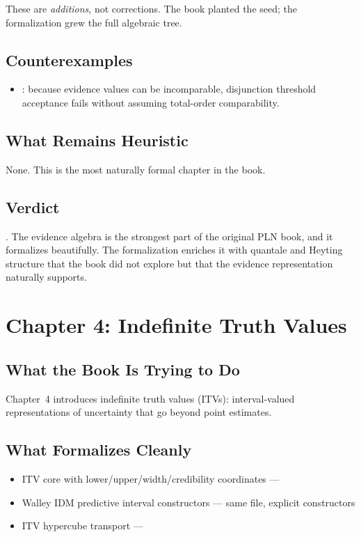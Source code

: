 \documentclass[11pt,openany]{report}
\begin{document}
These are \emph{additions}, not corrections.  The book planted the seed;
the formalization grew the full algebraic tree.

\section{Counterexamples}

\begin{itemize}
\item {}: because evidence values can be
  incomparable, disjunction threshold acceptance fails without assuming
  total-order comparability.
\end{itemize}

\section{What Remains Heuristic}

None.  This is the most naturally formal chapter in the book.

\section{Verdict}

\verdictClean{}.  The evidence algebra is the strongest part of the
original PLN book, and it formalizes beautifully.  The formalization
enriches it with quantale and Heyting structure that the book did not
explore but that the evidence representation naturally supports.


\chapter{Chapter 4: Indefinite Truth Values}
\label{ch:review-ch4}

\section{What the Book Is Trying to Do}

Chapter~4 introduces indefinite truth values (ITVs): interval-valued
representations of uncertainty that go beyond point estimates.

\section{What Formalizes Cleanly}

\begin{itemize}
\item ITV core with lower/upper/width/credibility coordinates ---
\item Walley IDM predictive interval constructors ---
  same file, explicit  constructors
\item ITV hypercube transport ---
\end{itemize}
\end{document}
